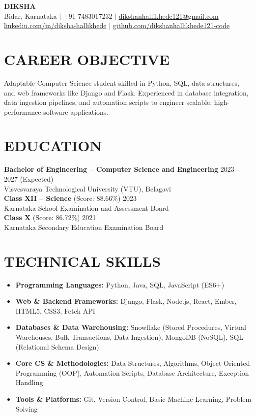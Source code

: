 \documentclass[10pt,a4paper]{article}
\begin{document}
\begin{center}
    {\Huge \textbf{DIKSHA}}\\[6pt]
    Bidar, Karnataka $|$ +91 7483017232 $|$ \href{mailto:dikshanhallikhede121@gmail.com}{dikshanhallikhede121@gmail.com}\\
    \href{https://linkedin.com/in/diksha-hallikhede}{linkedin.com/in/diksha-hallikhede} $|$ \href{https://github.com/dikshanhallikhede121-code}{github.com/dikshanhallikhede121-code}
\end{center}

\vspace{-5pt}

\section*{CAREER OBJECTIVE}
Adaptable Computer Science student skilled in Python, SQL, data structures, and web frameworks like Django and Flask. Experienced in database integration, data ingestion pipelines, and automation scripts to engineer scalable, high-performance software applications.

\section*{EDUCATION}
\textbf{Bachelor of Engineering -- Computer Science and Engineering} \hfill 2023 -- 2027 (Expected)\\
Visvesvaraya Technological University (VTU), Belagavi\\[4pt]
\textbf{Class XII -- Science} (Score: 88.66\%) \hfill 2023\\
Karnataka School Examination and Assessment Board\\[4pt]
\textbf{Class X} (Score: 86.72\%) \hfill 2021\\
Karnataka Secondary Education Examination Board

\section*{TECHNICAL SKILLS}
\begin{itemize}[leftmargin=*, noitemsep, topsep=0pt]
    \item \textbf{Programming Languages:} Python, Java, SQL, JavaScript (ES6+)
    \item \textbf{Web \& Backend Frameworks:} Django, Flask, Node.js, React, Ember, HTML5, CSS3, Fetch API
    \item \textbf{Databases \& Data Warehousing:} Snowflake (Stored Procedures, Virtual Warehouses, Bulk Transactions, Data Ingestion), MongoDB (NoSQL), SQL (Relational Schema Design)
    \item \textbf{Core CS \& Methodologies:} Data Structures, Algorithms, Object-Oriented Programming (OOP), Automation Scripts, Database Architecture, Exception Handling
    \item \textbf{Tools \& Platforms:} Git, Version Control, Basic Machine Learning, Problem Solving
\end{itemize}
\end{document}
